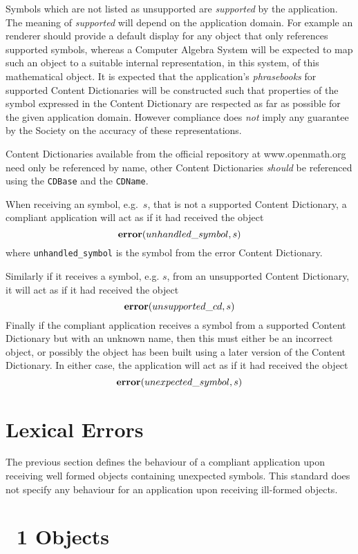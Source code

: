 Symbols which are not listed as unsupported are \emph{supported} by the application. The
meaning of \emph{supported} will depend on the application domain. For example an \OM
renderer should provide a default display for any \OM object that only references
supported symbols, whereas a Computer Algebra System will be expected to map such an
object to a suitable internal representation, in this system, of this mathematical
object. It is expected that the application's \emph{phrasebooks} for supported Content
Dictionaries will be constructed such that properties of the symbol expressed in the
Content Dictionary are respected as far as possible for the given application
domain. However \OM compliance does \emph{not} imply any guarantee by the \OM Society on
the accuracy of these representations.

Content Dictionaries available from the official \OM repository at www.openmath.org need
only be referenced by name, other Content Dictionaries \emph{should} be referenced using
the \lstinline|CDBase| and the \lstinline|CDName|.


When receiving an \OM symbol, e.g.~$s$, that is not a supported Content Dictionary, a
compliant application will act as if it had received the \OM object 
\[\mathbf{error}(unhandled\_symbol,s)\]
where \lstinline|unhandled_symbol| is the symbol from the error Content Dictionary.



Similarly if it receives a symbol, e.g. $s$, from an unsupported Content Dictionary, it
will act as if it had received the \OM object
\[\mathbf{error}(unsupported\_cd,s)\]
Finally if the compliant application receives a symbol from a supported Content Dictionary
but with an unknown name, then this must either be an incorrect object, or possibly the
object has been built using a later version of the Content Dictionary. In either case, the
application will act as if it had received the \OM object
\[\mathbf{error}(unexpected\_symbol,s)\]

\section{Lexical Errors}\label{sec_comp_lex}

The previous section defines the behaviour of a compliant application upon receiving well
formed \OM objects containing unexpected symbols.  This standard does not specify any
behaviour for an application upon receiving ill-formed objects.

\section{\OM~1 Objects}\label{sec_compl_om1}

